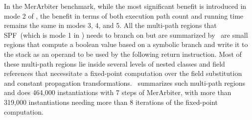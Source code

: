 In the MerArbiter benchmark, while the most significant benefit is introduced in mode 2 of \tool, the benefit in terms of
both execution path count and running time remains the same in modes 3, 4, and 5.
%
All the multi-path regions that SPF~(which is mode 1 in \tool) needs to branch on but are summarized by \tool\ are small
regions that compute a boolean value based on a symbolic branch and write it to the stack as an operand to be used
by the following return instruction.
%
Most of these multi-path regions lie inside several levels of nested classes and field references that necessitate
a fixed-point computation over the field substitution and constant propagation transformations.
%
\tool\ summarizes such multi-path regions and does 464,000 instantiations with 7 steps of MerArbiter, with more than
319,000 instantiations needing more than 8 iterations of the fixed-point computation.